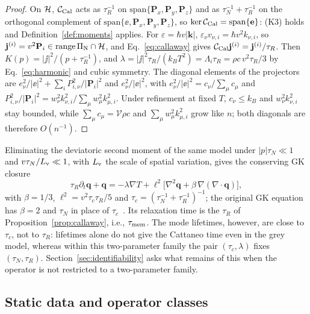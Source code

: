 \begin{proof}
On $\mathcal H$, $\mathcal C_{\rm Cal}$ acts as $\tau_R^{-1}$ on $\mathrm{span}\{\mathbf P_x,\mathbf P_y,\mathbf P_z\}$ and
as $\tau_N^{-1}+\tau_R^{-1}$ on the orthogonal complement of $\mathrm{span}\{\ee,\mathbf P_x,\mathbf P_y,\mathbf P_z\}$,
so $\ker\mathcal C_{\rm Cal}=\mathrm{span}\{\mathbf e\}$: (K3) holds and Definition~\ref{def:moments} applies.
For $\varepsilon=\hbar v|\mathbf k|$, $\varepsilon_\nu v_{\nu,i}=\hbar v^2k_{\nu,i}$, so
$\mathbf j^{(i)}=v^2\mathbf P_i\in\mathrm{range}\,\Pi_{\rm N}\cap\mathcal H$, and Eq.~\eqref{eq:callaway} gives
$\mathcal C_{\rm Cal}\mathbf j^{(i)}=\mathbf j^{(i)}/\tau_R$. Then $K(p)=|\jj|^2/(p+\tau_R^{-1})$, and
$\lambda=|\jj|^2\tau_R/(k_BT^2)=\Lambda_i\tau_R=\rho c\,v^2\tau_R/3$ by Eq.~\eqref{eq:harmonic} and cubic
symmetry. The diagonal elements of the projectors are $e_\nu^2/|\ee|^2+\sum_iP_{i,\nu}^2/|\mathbf P_i|^2$
and $e_\nu^2/|\ee|^2$, with $e_\nu^2/|\ee|^2=c_\nu/\sum_\mu c_\mu$ and
$P_{i,\nu}^2/|\mathbf P_i|^2=w_\nu^2k_{\nu,i}^2/\sum_\mu w_\mu^2k_{\mu,i}^2$. Under refinement at fixed $T$,
$c_\nu\le k_B$ and $w_\nu^2k_{\nu,i}^2$ stay bounded, while $\sum_\mu c_\mu=\mathcal V\rho c$ and
$\sum_\mu w_\mu^2k_{\mu,i}^2$ grow like $n$; both diagonals are therefore $O(n^{-1})$.
\end{proof}

Eliminating the deviatoric second moment of the same model under $|p|\tau_N\ll1$ and
$v\tau_N/L_{\rm v}\ll1$, with $L_{\rm v}$ the scale of spatial variation, gives the conserving GK
closure~\cite{GuoWang2022,Sendra2021,Sendra2022}
\begin{equation}
\tau_R\partial_t\mathbf q+\mathbf q=-\lambda\nabla T+\ell^2\big[\nabla^2\mathbf q+\beta\,\nabla(\nabla\cdot\mathbf q)\big],
\label{eq:gk}
\end{equation}
with $\beta=1/3$, $\ell^2=v^2\tau_c\tau_R/5$ and $\tau_c=(\tau_N^{-1}+\tau_R^{-1})^{-1}$; the original
GK equation has $\beta=2$ and $\tau_N$ in place of $\tau_c$~\cite{GuyerKrumhansl1966b}. Its relaxation
time is the $\tau_R$ of Proposition~\ref{prop:callaway}, i.e., $\tau_{\rm mem}$. The mode lifetimes, however, are
close to $\tau_c$, not to $\tau_R$: lifetimes alone do not give the Cattaneo time even in the grey
model, whereas within this two-parameter family the pair $(\tau_c,\lambda)$ fixes $(\tau_N,\tau_R)$.
Section~\ref{sec:identifiability} asks what remains of this when the operator is not restricted to a
two-parameter family.

\subsection{Static data and operator classes}\label{sec:classes}

